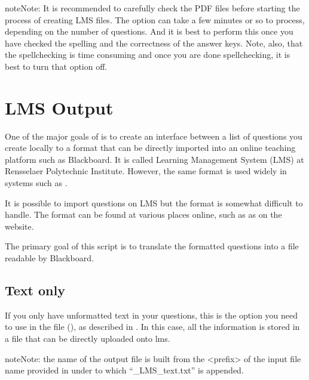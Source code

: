 \documentclass[letterpaper,10pt,english]{sphinxmanual}
\begin{document}
\begin{sphinxadmonition}{note}{Note:}
It is recommended to carefully check the PDF files before starting the process of creating LMS files. The  option can take a few minutes or so to process, depending on the number of questions. And it is best to perform this once you have checked the spelling and the correctness of the answer keys. Note, also, that the spellchecking is time consuming and once you are done spellchecking, it is best to turn that option off.
\end{sphinxadmonition}


\chapter{LMS Output}
\label{\detokenize{lms:lms-output}}\label{\detokenize{lms:lms-label}}\label{\detokenize{lms::doc}}
One of the major goals of  is to create an interface between a list of questions you create locally to a format that can be directly imported into an online teaching platform such as Blackboard. It is called Learning Management System (LMS) at Rensselaer Polytechnic Institute. However, the same format is used widely in systems such as .

It is possible to import questions on LMS but the format is somewhat
difficult to handle. The format can be found at various places online,
such as as on the  website.

The primary goal of this script is to translate the \sphinxhyphen{}formatted questions into a file readable by Blackboard.


\section{Text only}
\label{\detokenize{lms:text-only}}
If you only have unformatted text in your questions, this is the option you need to use in the  file (), as described in {\hyperref[\detokenize{usage:config-label}]{}}. In this case, all the information is stored in a file that can be directly uploaded onto lms.

\begin{sphinxadmonition}{note}{Note:}
the name of the output file is built from the \textless{}prefix\textgreater{} of the input file name provided in  under  to which “\_LMS\_text.txt” is appended.
\end{sphinxadmonition}
\end{document}
